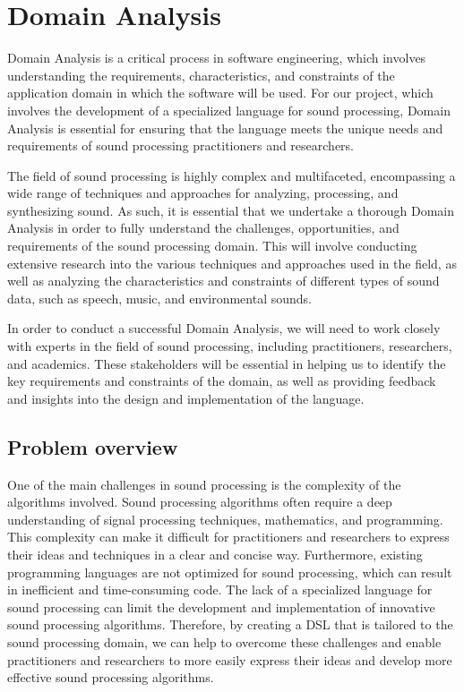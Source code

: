 \chapter{Domain Analysis}

Domain Analysis is a critical process in software engineering, which involves understanding the requirements, characteristics, and constraints of the application domain in which the software will be used. For our project, which involves the development of a specialized language for sound processing, Domain Analysis is essential for ensuring that the language meets the unique needs and requirements of sound processing practitioners and researchers.


The field of sound processing is highly complex and multifaceted, encompassing a wide range of techniques and approaches for analyzing, processing, and synthesizing sound. As such, it is essential that we undertake a thorough Domain Analysis in order to fully understand the challenges, opportunities, and requirements of the sound processing domain. This will involve conducting extensive research into the various techniques and approaches used in the field, as well as analyzing the characteristics and constraints of different types of sound data, such as speech, music, and environmental sounds.

In order to conduct a successful Domain Analysis, we will need to work closely with experts in the field of sound processing, including practitioners, researchers, and academics. These stakeholders will be essential in helping us to identify the key requirements and constraints of the domain, as well as providing feedback and insights into the design and implementation of the language.


\section{Problem overview} 
One of the main challenges in sound processing is the complexity of the algorithms involved. Sound processing algorithms often require a deep understanding of signal processing techniques, mathematics, and programming. This complexity can make it difficult for practitioners and researchers to express their ideas and techniques in a clear and concise way. Furthermore, existing programming languages are not optimized for sound processing, which can result in inefficient and time-consuming code. The lack of a specialized language for sound processing can limit the development and implementation of innovative sound processing algorithms. Therefore, by creating a DSL that is tailored to the sound processing domain, we can help to overcome these challenges and enable practitioners and researchers to more easily express their ideas and develop more effective sound processing algorithms.

